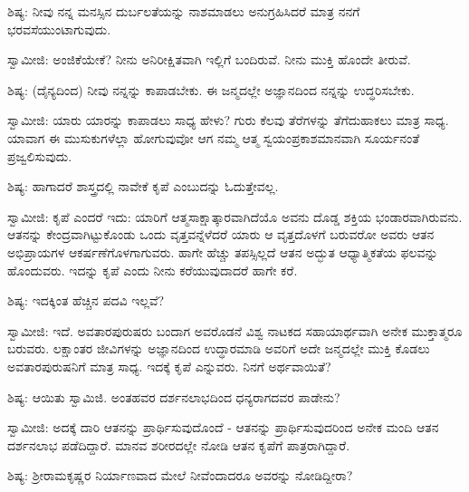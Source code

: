 ಶಿಷ್ಯ: ನೀವು ನನ್ನ ಮನಸ್ಸಿನ ದುರ್ಬಲತೆಯನ್ನು ನಾಶಮಾಡಲು ಅನುಗ್ರಹಿಸಿದರೆ ಮಾತ್ರ ನನಗೆ ಭರವಸೆಯುಂಟಾಗುವುದು.

ಸ್ವಾಮೀಜಿ: ಅಂಜಿಕೆಯೇಕೆ? ನೀನು ಅನಿರೀಕ್ಷಿತವಾಗಿ ಇಲ್ಲಿಗೆ ಬಂದಿರುವೆ. ನೀನು ಮುಕ್ತಿ ಹೊಂದೇ ತೀರುವೆ.

ಶಿಷ್ಯ: (ದೈನ್ಯದಿಂದ) ನೀವು ನನ್ನನ್ನು ಕಾಪಾಡಬೇಕು. ಈ ಜನ್ಮದಲ್ಲೇ ಅಜ್ಞಾನದಿಂದ ನನ್ನನ್ನು ಉದ್ಧರಿಸಬೇಕು.

ಸ್ವಾಮೀಜಿ: ಯಾರು ಯಾರನ್ನು ಕಾಪಾಡಲು ಸಾಧ್ಯ ಹೇಳು? ಗುರು ಕೆಲವು ತೆರೆಗಳನ್ನು ತೆಗೆದುಹಾಕಲು ಮಾತ್ರ ಸಾಧ್ಯ. ಯಾವಾಗ ಈ ಮುಸುಕುಗಳೆಲ್ಲಾ ಹೋಗುವುವೋ ಆಗ ನಮ್ಮ ಆತ್ಮ ಸ್ವಯಂಪ್ರಕಾಶಮಾನವಾಗಿ ಸೂರ್ಯನಂತೆ ಪ್ರಜ್ವಲಿಸುವುದು.

ಶಿಷ್ಯ: ಹಾಗಾದರೆ ಶಾಸ್ತ್ರದಲ್ಲಿ ನಾವೇಕೆ ಕೃಪೆ ಎಂಬುದನ್ನು ಓದುತ್ತೇವಲ್ಲ.

ಸ್ವಾಮೀಜಿ: ಕೃಪೆ ಎಂದರೆ ಇದು: ಯಾರಿಗೆ ಆತ್ಮಸಾಕ್ಷಾತ್ಕಾರವಾಗಿದೆಯೊ ಅವನು ದೊಡ್ಡ ಶಕ್ತಿಯ ಭಂಡಾರವಾಗಿರುವನು. ಆತನನ್ನು ಕೇಂದ್ರವಾಗಿಟ್ಟುಕೊಂಡು ಒಂದು ವೃತ್ತವನ್ನೆಳೆದರೆ ಯಾರು ಆ ವೃತ್ತದೊಳಗೆ ಬರುವರೋ ಅವರು ಆತನ ಅಭಿಪ್ರಾಯಗಳ ಆಕರ್ಷಣೆಗೊಳಗಾಗುವರು. ಹಾಗೇ ಹೆಚ್ಚು ತಪಸ್ಸಿಲ್ಲದೆ ಆತನ ಅದ್ಭುತ ಆಧ್ಯಾತ್ಮಿಕತೆಯ ಫಲವನ್ನು ಹೊಂದುವರು. ಇದನ್ನು ಕೃಪೆ ಎಂದು ನೀನು ಕರೆಯುವುದಾದರೆ ಹಾಗೇ ಕರೆ.

ಶಿಷ್ಯ: ಇದಕ್ಕಿಂತ ಹೆಚ್ಚಿನ ಪದವಿ ಇಲ್ಲವೆ?

ಸ್ವಾಮೀಜಿ: ಇದೆ. ಅವತಾರಪುರುಷರು ಬಂದಾಗ ಅವರೊಡನೆ ವಿಶ್ವ ನಾಟಕದ ಸಹಾಯಾರ್ಥವಾಗಿ ಅನೇಕ ಮುಕ್ತಾತ್ಮರೂ ಬರುವರು. ಲಕ್ಷಾಂತರ ಜೀವಿಗಳನ್ನು ಅಜ್ಞಾನದಿಂದ ಉದ್ಧಾರಮಾಡಿ ಅವರಿಗೆ ಅದೇ ಜನ್ಮದಲ್ಲೇ ಮುಕ್ತಿ ಕೊಡಲು ಅವತಾರಪುರುಷನಿಗೆ ಮಾತ್ರ ಸಾಧ್ಯ. ಇದಕ್ಕೆ ಕೃಪೆ ಎನ್ನುವರು. ನಿನಗೆ ಅರ್ಥವಾಯಿತೆ?

ಶಿಷ್ಯ: ಆಯಿತು ಸ್ವಾಮಿಜಿ. ಅಂತಹವರ ದರ್ಶನಲಾಭದಿಂದ ಧನ್ಯರಾಗದವರ ಪಾಡೇನು?

ಸ್ವಾಮೀಜಿ: ಅದಕ್ಕೆ ದಾರಿ ಆತನನ್ನು ಪ್ರಾರ್ಥಿಸುವುದೊಂದೆ - ಆತನನ್ನು ಪ್ರಾರ್ಥಿಸುವುದರಿಂದ ಅನೇಕ ಮಂದಿ ಆತನ ದರ್ಶನಲಾಭ ಪಡೆದಿದ್ದಾರೆ. ಮಾನವ ಶರೀರದಲ್ಲೇ ನೋಡಿ ಆತನ ಕೃಪೆಗೆ ಪಾತ್ರರಾಗಿದ್ದಾರೆ.

ಶಿಷ್ಯ: ಶ‍್ರೀರಾಮಕೃಷ್ಣರ ನಿರ್ಯಾಣವಾದ ಮೇಲೆ ನೀವೆಂದಾದರೂ ಅವರನ್ನು ನೋಡಿದ್ದೀರಾ?

